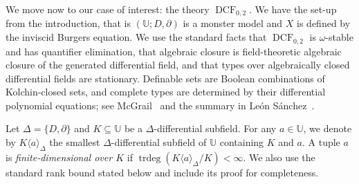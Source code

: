 \documentclass[10pt,a4paper]{amsart}
\newcommand{\DCF}{\operatorname{DCF}}
\newcommand{\trdeg}{\operatorname{trdeg}}
\newcommand{\Ucal}{{\mathds{U}}}
\newcommand{\Uu}{{\mathds{U}}}
\begin{document}
We move now to our case of interest: the theory $\DCF_{0,2}$. We have the set-up from the introduction, that is $(\Ucal;D,\partial)$ is a monster model and $X$ is defined by the inviscid Burgers equation.
We use the standard facts that $\DCF_{0,2}$ is $\omega$-stable and has
quantifier elimination, that algebraic closure is field-theoretic
algebraic closure of the generated differential field, and that types
over algebraically closed differential fields are stationary.
Definable sets are Boolean combinations of Kolchin-closed sets, and
complete types are determined by their differential polynomial
equations; see McGrail~\cite{McGrail} and the summary in
Le\'on S\'anchez~\cite{LS}.

Let $\Delta=\{D,\partial\}$ and $K\subseteq \Uu$ be a $\Delta$-differential subfield. For any $a\in \Uu$, we denote by $K\langle a\rangle_\Delta$ the smallest $\Delta$-differential subfield of $\Uu$ containing $K$ and $a$. A tuple $a$ is \emph{finite-dimensional over $K$} if
$\trdeg(K\langle a\rangle_\Delta/K)<\infty$.
We also use the standard  rank bound stated below and include its proof for completeness.
\end{document}
